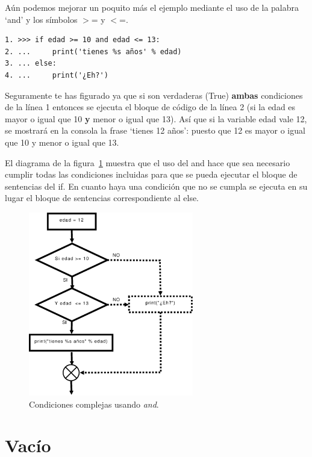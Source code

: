 Aún podemos mejorar un poquito más el ejemplo mediante el uso de la palabra `and' y los símbolos $>$= y $<$=.

\begin{listing}
\begin{verbatim}
1. >>> if edad >= 10 and edad <= 13:
2. ...     print('tienes %s años' % edad)
3. ... else:
4. ...     print('¿Eh?')
\end{verbatim}
\end{listing}

Seguramente te has figurado ya que si son verdaderas (True) \textbf{ambas} condiciones de la línea 1 entonces se ejecuta el bloque de código de la línea 2 (si la edad es mayor o igual que 10 \textbf{y} menor o igual que 13). Así que si la variable edad vale 12, se mostrará en la consola la frase `tienes 12 años': puesto que 12 es mayor o igual que 10 y menor o igual que 13.  

El diagrama de la figura~\ref{if9} muestra que el uso del and hace que sea necesario cumplir todas las condiciones incluidas para que se pueda ejecutar el bloque de sentencias del if. En cuanto haya una condición que no se cumpla se ejecuta en su lugar el bloque de sentencias correspondiente al else.

\begin{figure}
\begin{center}
\includegraphics[width=72mm]{if9.eps}
\end{center}
\caption{Condiciones complejas usando \emph{and}.}\label{if9}
\end{figure}

\section{Vacío}

